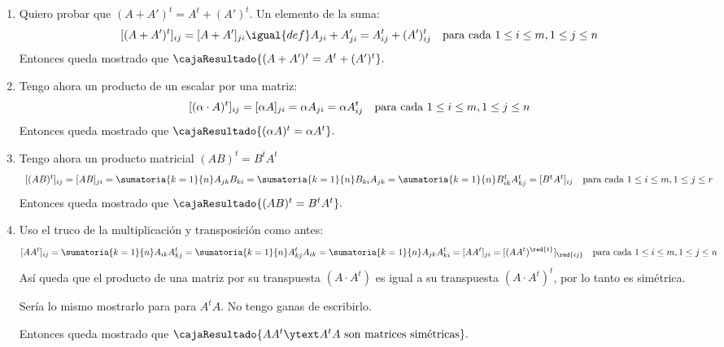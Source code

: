 \begin{enumerate}[label=(\alph*)]
  \item  Quiero probar que $(A + A')^t = A^t + (A')^t$. Un elemento de la suma:
        $$
          [(A + A')^t]_{ij}
            =
            [A + A']_{ji} \igual{def} A_{ji} + A'_{ji}
          =
          A^t_{ij} + (A')^t_{ij}
          \text{\quad para cada } 1 \leq i \leq m, 1 \leq j \leq n
        $$
        Entonces queda mostrado que
        $
          \cajaResultado{
            (A + A')^t = A^t + (A')^t
          }.
        $

  \item Tengo ahora un producto de un escalar por una matriz:
        $$
          [(\alpha \cdot A)^t]_{ij}
            = [\alpha A]_{ji}
          = \alpha A_{ji}
          = \alpha A^t_{ij}
          \text{\quad para cada } 1 \leq i \leq m, 1 \leq j \leq n
        $$
        Entonces queda mostrado que
        $
          \cajaResultado{
            (\alpha A)^t = \alpha A^t
          }.
        $

  \item Tengo ahora un producto matricial $(AB)^t = B^tA^t$
        $$
          \begin{array}{c}
            [(AB)^t]_{ij}
              =
              [AB]_{ji} =
            \sumatoria{k = 1}{n} A_{jk} B_{ki} =
            \sumatoria{k = 1}{n} B_{ki} A_{jk} =
            \sumatoria{k = 1}{n} B^t_{ik} A^t_{kj} =
              [B^t A^t]_{ij}
            \text{\quad para cada } 1 \leq i \leq m, 1 \leq j \leq r
          \end{array}
        $$
        Entonces queda mostrado que
        $
          \cajaResultado{
            (AB)^t = B^t A^t
          }.
        $

  \item Uso el truco de la multiplicación y transposición como antes:
        $$
          [A A^t]_{ij} =
          \sumatoria{k = 1}{n} A_{ik} A^t_{kj} =
          \sumatoria{k = 1}{n}  A^t_{kj} A_{ik}=
          \sumatoria{k = 1}{n}  A_{jk} A^t_{ki} =
          [A A^t]_{ji} = [(A A^t)^{\red{t}}]_{\red{ij}}
          \text{\quad para cada } 1 \leq i \leq m, 1 \leq j \leq n
        $$
        Así queda que el producto de una matriz por su transpuesta $(A \cdot A^t)$ es igual a su transpuesta $(A \cdot A^t)^t$, por lo tanto
        es simétrica.

        Sería lo mismo mostrarlo para para $A^tA$. {\tiny No tengo ganas de escribirlo.}

        Entonces queda mostrado que
        $
          \cajaResultado{
            AA^t \ytext A^tA
            \text{ son matrices simétricas}}.
        $


\end{enumerate}
